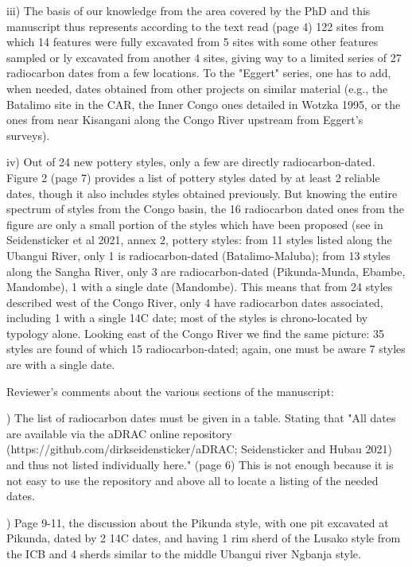 \begin{reviewer}
iii) The basis of our knowledge from the area covered by the PhD and this manuscript thus represents according to the text read (page 4) 122 sites from which 14 features were fully excavated from 5 sites with some other features sampled or ly excavated from another 4 sites, giving way to a limited series of 27 radiocarbon dates from a few locations. To the "Eggert" series, one has to add, when needed, dates obtained from other projects on similar material (e.g., the Batalimo site in the CAR, the Inner Congo ones detailed in Wotzka 1995, or the ones from near Kisangani along the Congo River upstream from Eggert's surveys).

iv) Out of 24 new pottery styles, only a few are directly radiocarbon-dated. Figure 2 (page 7) provides a list of pottery styles dated by at least 2 reliable dates, though it also includes styles obtained previously. But knowing the entire spectrum of styles from the Congo basin, the 16 radiocarbon dated ones from the figure are only a small portion of the styles which have been proposed (see in Seidensticker et al 2021, annex 2, pottery styles: from 11 styles listed along the Ubangui River, only 1 is radiocarbon-dated (Batalimo-Maluba); from 13 styles along the Sangha River, only 3 are radiocarbon-dated (Pikunda-Munda, Ebambe, Mandombe), 1 with a single date (Mandombe). This means that from 24 styles described west of the Congo River, only 4 have radiocarbon dates associated, including 1 with a single 14C date; most of the styles is chrono-located by typology alone. Looking east of the Congo River we find the same picture: 35 styles are found of which 15 radiocarbon-dated; again, one must be aware 7 styles are with a single date.

Reviewer's comments about the various sections of the manuscript:

) The list of radiocarbon dates must be given in a table. Stating that "All dates are available via the aDRAC online repository (https://github.com/dirkseidensticker/aDRAC; Seidensticker and Hubau 2021) and thus not listed individually here." (page 6) This is not enough because it is not easy to use the repository and above all to locate a listing of the needed dates.


) Page 9-11, the discussion about the Pikunda style, with one pit excavated at Pikunda, dated by 2 14C dates, and having 1 rim sherd of the Lusako style from the ICB and 4 sherds similar to the middle Ubangui river Ngbanja style.


\end{reviewer}
